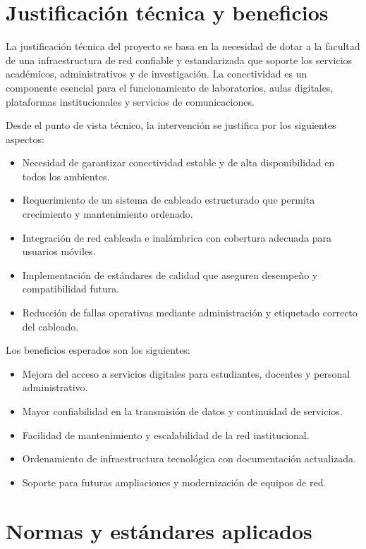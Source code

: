\section{Justificación técnica y beneficios}

La justificación técnica del proyecto se basa en la necesidad de dotar a la facultad de una infraestructura de red confiable y estandarizada que soporte los servicios académicos, administrativos y de investigación. La conectividad es un componente esencial para el funcionamiento de laboratorios, aulas digitales, plataformas institucionales y servicios de comunicaciones.

Desde el punto de vista técnico, la intervención se justifica por los siguientes aspectos:

\begin{itemize}
    \item Necesidad de garantizar conectividad estable y de alta disponibilidad en todos los ambientes.
    \item Requerimiento de un sistema de cableado estructurado que permita crecimiento y mantenimiento ordenado.
    \item Integración de red cableada e inalámbrica con cobertura adecuada para usuarios móviles.
    \item Implementación de estándares de calidad que aseguren desempeño y compatibilidad futura.
    \item Reducción de fallas operativas mediante administración y etiquetado correcto del cableado.
\end{itemize}

Los beneficios esperados son los siguientes:

\begin{itemize}
    \item Mejora del acceso a servicios digitales para estudiantes, docentes y personal administrativo.
    \item Mayor confiabilidad en la transmisión de datos y continuidad de servicios.
    \item Facilidad de mantenimiento y escalabilidad de la red institucional.
    \item Ordenamiento de infraestructura tecnológica con documentación actualizada.
    \item Soporte para futuras ampliaciones y modernización de equipos de red.
\end{itemize}

\section{Normas y estándares aplicados}

